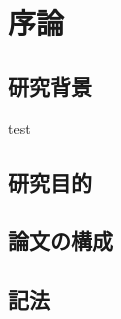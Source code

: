 \chapter{序論} \label{ch:intro}
\section{研究背景}
test  \cite{Wie1985,Wie2001}

\section{研究目的}

\section{論文の構成}

\section{記法}